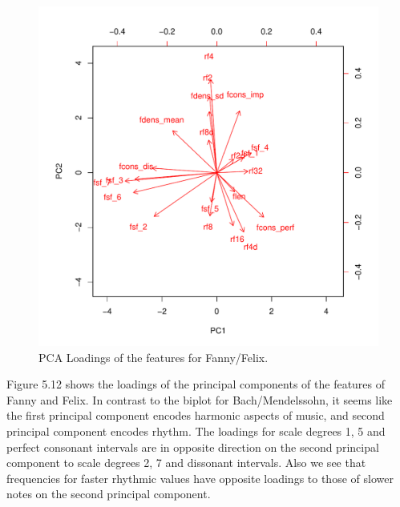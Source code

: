 \documentclass[12pt,twoside]{reedthesis}
\theoremstyle{definition}
\theoremstyle{definition}
\theoremstyle{definition}
\theoremstyle{remark}
\begin{document}
\begin{figure}[H]
\centering
\includegraphics[scale = .7]{images/biplot_f.pdf}
\caption{PCA Loadings of the features for Fanny/Felix.}
\label{subd}
\end{figure}
Figure 5.12 shows the loadings of the principal components of the
features of Fanny and Felix. In contrast to the biplot for
Bach/Mendelssohn, it seems like the first principal component encodes
harmonic aspects of music, and second principal component encodes
rhythm. The loadings for scale degrees 1, 5 and perfect consonant
intervals are in opposite direction on the second principal component to
scale degrees 2, 7 and dissonant intervals. Also we see that frequencies
for faster rhythmic values have opposite loadings to those of slower
notes on the second principal component.
\end{document}
